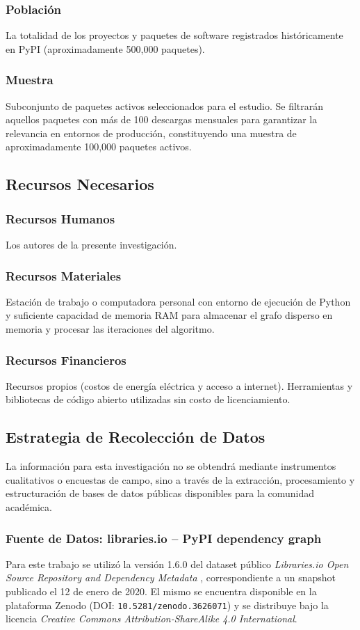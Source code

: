 \subsubsection{Población}
La totalidad de los proyectos y paquetes de software registrados históricamente en PyPI (aproximadamente 500,000 paquetes).
\subsubsection{Muestra}
Subconjunto de paquetes activos seleccionados para el estudio. Se filtrarán aquellos paquetes con más de 100 descargas mensuales para garantizar la relevancia en entornos de producción, constituyendo una muestra de aproximadamente 100,000 paquetes activos.

\subsection{Recursos Necesarios}
\subsubsection{Recursos Humanos}
Los autores de la presente investigación.
\subsubsection{Recursos Materiales}
Estación de trabajo o computadora personal con entorno de ejecución de Python y suficiente capacidad de memoria RAM para almacenar el grafo disperso en memoria y procesar las iteraciones del algoritmo.
\subsubsection{Recursos Financieros}
Recursos propios (costos de energía eléctrica y acceso a internet). Herramientas y bibliotecas de código abierto utilizadas sin costo de licenciamiento.

\subsection{Estrategia de Recolección de Datos}

La información para esta investigación no se obtendrá mediante instrumentos cualitativos o encuestas de campo, sino a través de la extracción, procesamiento y estructuración de bases de datos públicas disponibles para la comunidad académica.

\subsubsection{Fuente de Datos: libraries.io – PyPI dependency graph}
Para este trabajo se utilizó la versión 1.6.0 del dataset público \textit{Libraries.io Open Source Repository and Dependency Metadata} \autocite{librariesio}, correspondiente a un snapshot publicado el 12 de enero de 2020. El mismo se encuentra disponible en la plataforma Zenodo (DOI: \texttt{10.5281/zenodo.3626071}) y se distribuye bajo la licencia \textit{Creative Commons Attribution-ShareAlike 4.0 International}.

